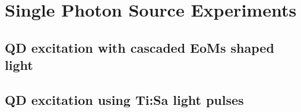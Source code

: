 \chapter{Single Photon Source Experiments}
\section{QD excitation with cascaded EoMs shaped light}
\section{QD excitation using Ti:Sa light pulses}